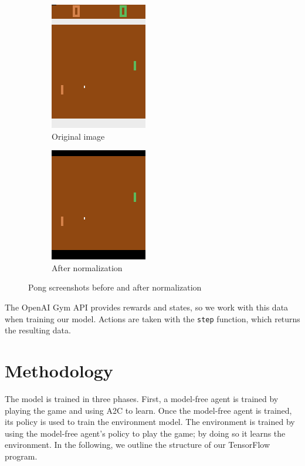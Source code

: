 \documentclass[10pt, twocolumn]{article}
\begin{document}
\begin{figure}[h]
\centering
\begin{subfigure}[b]{.2\textwidth}
  \centering
  \includegraphics[scale=0.5]{unnormalized}
  \caption{Original image}
  \label{fig:unnormalized}
\end{subfigure} 
\begin{subfigure}[b]{.2\textwidth}
  \centering
  \includegraphics[scale=0.5]{normalized}
  \caption{After normalization}
  \label{fig:normalized}
\end{subfigure} \hfill
\caption{Pong screenshots before and after normalization}
\label{screenshots}
\end{figure}

The OpenAI Gym API provides rewards and states, so we work with this data when training our model.
Actions are taken with the \verb|step| function, which returns the resulting data.

\section{Methodology}

The model is trained in three phases. First, a model-free agent is trained by playing the game and using
A2C to learn. Once the model-free agent is trained, its policy is used to train the environment model.
The environment is trained by using the model-free agent's policy to play the game; by doing so it learns the
environment. In the following, we outline the structure of our TensorFlow program.
\end{document}
